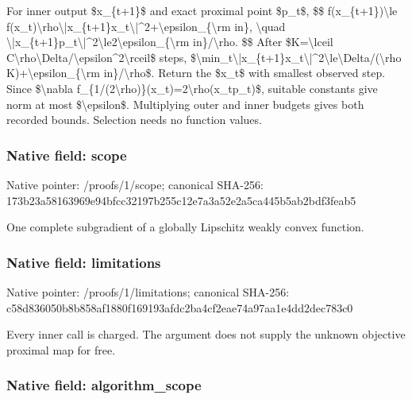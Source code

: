 \documentclass[10pt,a4paper]{article}
\begin{document}
For inner output \$x\_\{t+1\}\$ and exact proximal point \$p\_t\$,
\$\$
f(x\_\{t+1\})\textbackslash{}le f(x\_t)\textbackslash{}rho\textbackslash{}|x\_\{t+1\}x\_t\allowbreak{}\textbackslash{}|\textasciicircum{}2+\textbackslash{}epsilon\_\{\textbackslash{}rm in\},
\textbackslash{}quad
\textbackslash{}|x\_\{t+1\}p\_t\textbackslash{}|\textasciicircum{}2\textbackslash{}le2\textbackslash{}epsilon\_\{\textbackslash{}rm in\}/\textbackslash{}rho.
\$\$
After \$K=\textbackslash{}lceil C\textbackslash{}rho\textbackslash{}Delta/\textbackslash{}epsilon\textasciicircum{}2\textbackslash{}rceil\$ steps,
\$\textbackslash{}min\_t\textbackslash{}|x\_\{t+1\}x\_t\textbackslash{}|\textasciicircum{}2\textbackslash{}le\textbackslash{}Delta/(\textbackslash{}rho K)+\textbackslash{}epsilon\_\{\textbackslash{}rm in\}/\textbackslash{}rho\$.
Return the \$x\_t\$ with smallest observed step. Since
\$\textbackslash{}nabla f\_\{1/(2\textbackslash{}rho)\}(x\_t)=2\textbackslash{}rho(x\_tp\_t)\$, suitable constants give norm at most \$\textbackslash{}epsilon\$. Multiplying outer and inner budgets gives both recorded bounds. Selection needs no function values.


\subsubsection{Native field: scope}


Native pointer: /proofs/1/scope; canonical SHA-256: 173b23a58163969e94bfcc32\allowbreak{}197b255c12e7a3a52e2a5ca4\allowbreak{}45b5ab2bdf3feab5


One complete subgradient of a globally Lipschitz weakly convex function.


\subsubsection{Native field: limitations}


Native pointer: /proofs/1/limitations; canonical SHA-256: c58d836050b8b858af1880f1\allowbreak{}69193afdc2ba4cf2eae74a97\allowbreak{}aa1e4dd2dec783c0


Every inner call is charged. The argument does not supply the unknown objective proximal map for free.


\subsubsection{Native field: algorithm\_scope}
\end{document}
